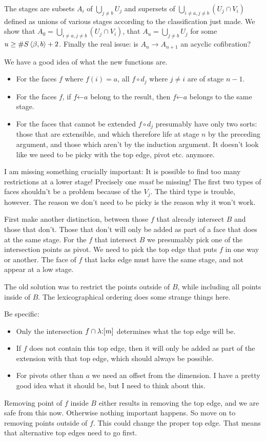 \documentclass[csh.tex]{subfiles}
\begin{document}
The stages are subsets $A_i$ of $\bigcup_{j\neq b}U_j$ and supersets of $\bigcup_{i\neq a,j\neq b}(U_j\cap V_i)$ defined as unions of various stages according to the classification just made. We show that $A_0 = \bigcup_{i\neq a,j\neq b}(U_j\cap V_i)$, that $A_u = \bigcup_{j\neq b}U_j$ for some $u\geq\#S\left\langle \beta,b \right\rangle+2$. Finally the real issue: is $A_n \to A_{n+1}$ an acyclic cofibration?

We have a good idea of what the new functions are. 
\begin{itemize}
\item For the faces $f$ where $f(i) = a$, all $f\circ d_j$ where $j\neq i$ are of stage $n - 1$.
\item For the faces $f$, if $f \mathord\leftarrow a$ belong to the result, then $f\mathord\leftarrow a$ belongs to the same stage.
\item For the faces that cannot be extended $f\circ d_j$ presumably have only two sorts: those that are extensible, and which therefore life at stage $n$ by the preceding argument, and those which aren't by the induction argument. It doesn't look like we need to be picky with the top edge, pivot etc. anymore.
\end{itemize}

I am missing something crucially important:
It is possible to find too many restrictions at a lower stage!
Precisely one \emph{must} be missing! The first two types of faces shouldn't be a problem because of the $V_j$.
The third type is trouble, however. The reason we don't need to be picky
is the reason why it won't work.

First make another distinction, between those $f$ that already intersect $B$ and those that don't. Those that don't will only be added as part of a face that does at the same stage. For the $f$ that intersect $B$ we presumably pick one of the intersection points as pivot.
We need to pick the top edge that puts $f$ in one way or another. The face of $f$ that lacks edge must have the same stage, and not appear at a low stage.

The old solution was to restrict the points outside of $B$, while including all points inside of $B$. The lexicographical ordering does some strange things here.

Be specific:
\begin{itemize} 
\item Only the intersection $f \cap \lambda\mathord : [m]$ determines what the top edge will be.
\item If $f$ does not contain this top edge, then it will only be added as part of the extension with that top edge, which should always be possible.
\item For pivots other than $a$ we need an offset from the dimension. I have a pretty good idea what it should be, but I need to think about this.
\end{itemize}
Removing point of $f$ inside $B$ either results in removing the top edge, and we are safe from this now. Otherwise nothing important happens. So move on to removing points outside of $f$. This could change the proper top edge. That means that alternative top edges need to go first.
\end{document}
